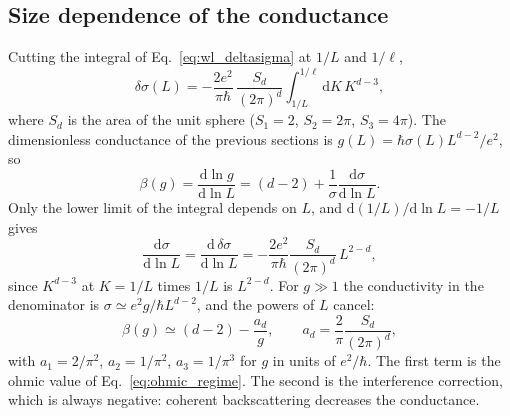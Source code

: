 \subsection*{Size dependence of the conductance}

Cutting the integral of Eq.~\eqref{eq:wl_deltasigma} at $1/L$ and $1/\ell$,
\[
\delta\sigma(L)=-\frac{2e^2}{\pi\hbar}\,\frac{S_d}{(2\pi)^d}\int_{1/L}^{1/\ell}\mathrm{d}K\,K^{d-3},
\]
where $S_d$ is the area of the unit sphere ($S_1=2$, $S_2=2\pi$, $S_3=4\pi$). The dimensionless conductance of the previous sections is $g(L)=\hbar\sigma(L)L^{d-2}/e^2$, so
\[
\beta(g)=\frac{\mathrm{d}\ln g}{\mathrm{d}\ln L}=(d-2)+\frac{1}{\sigma}\frac{\mathrm{d}\sigma}{\mathrm{d}\ln L}.
\]
Only the lower limit of the integral depends on $L$, and $\mathrm{d}(1/L)/\mathrm{d}\ln L=-1/L$ gives
\[
\frac{\mathrm{d}\sigma}{\mathrm{d}\ln L}=\frac{\mathrm{d}\,\delta\sigma}{\mathrm{d}\ln L}=-\frac{2e^2}{\pi\hbar}\frac{S_d}{(2\pi)^d}\,L^{2-d},
\]
since $K^{d-3}$ at $K=1/L$ times $1/L$ is $L^{2-d}$. For $g\gg1$ the conductivity in the denominator is $\sigma\simeq e^2g/\hbar L^{d-2}$, and the powers of $L$ cancel:
\begin{equation}
    \beta(g)\simeq(d-2)-\frac{a_d}{g},\qquad a_d=\frac{2}{\pi}\frac{S_d}{(2\pi)^d},
    \label{eq:wl_beta}
\end{equation}
with $a_1=2/\pi^2$, $a_2=1/\pi^2$, $a_3=1/\pi^3$ for $g$ in units of $e^2/\hbar$. The first term is the ohmic value of Eq.~\eqref{eq:ohmic_regime}. The second is the interference correction, which is always negative: coherent backscattering decreases the conductance.

